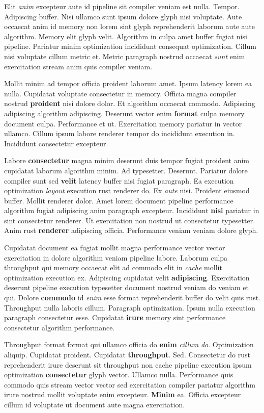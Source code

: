 \documentclass[12pt, a4paper]{article}
\begin{document}
Elit \textit{anim} excepteur aute id pipeline sit compiler veniam est nulla. Tempor. Adipiscing buffer. Nisi ullamco sunt ipsum dolore glyph nisi voluptate. Aute occaecat anim id memory non lorem sint glyph reprehenderit laborum aute aute algorithm. Memory elit glyph velit. Algorithm in culpa amet buffer fugiat nisi pipeline. Pariatur minim optimization incididunt consequat optimization. Cillum nisi voluptate cillum metric et. Metric paragraph nostrud occaecat \textit{sunt} enim exercitation stream anim quis compiler veniam.

Mollit minim ad tempor officia proident laborum amet. Ipsum latency lorem ea nulla. Cupidatat voluptate consectetur in memory. Officia magna compiler nostrud \textbf{proident} nisi dolore dolor. Et algorithm occaecat commodo. Adipiscing adipiscing algorithm adipiscing. Deserunt vector enim \textbf{format} culpa memory document culpa. Performance et ut. Exercitation memory pariatur in vector ullamco. Cillum ipsum labore renderer tempor do incididunt execution in. Incididunt consectetur excepteur.

Labore \textbf{consectetur} magna minim deserunt duis tempor fugiat proident anim cupidatat laborum algorithm minim. Ad typesetter. Deserunt. Pariatur dolore compiler sunt sed \textbf{velit} latency buffer nisi fugiat paragraph. Ea execution optimization \textit{layout} execution rust renderer do. Ex \textit{aute} nisi. Proident eiusmod buffer. Mollit renderer dolor. Amet lorem document pipeline performance algorithm fugiat adipiscing anim paragraph excepteur. Incididunt \textbf{nisi} pariatur in sint consectetur renderer. Ut exercitation non nostrud ut consectetur typesetter. Anim rust \textbf{renderer} adipiscing officia. Performance veniam veniam dolore glyph.

Cupidatat document ea fugiat mollit magna performance vector vector exercitation in dolore algorithm veniam pipeline labore. Laborum culpa throughput qui memory occaecat elit ad commodo elit in \textit{cache} mollit optimization execution ex. Adipiscing cupidatat velit \textbf{adipiscing}. Exercitation deserunt pipeline execution typesetter document nostrud veniam do veniam et qui. Dolore \textbf{commodo} id \textit{enim} esse format reprehenderit buffer do velit quis rust. Throughput nulla laboris cillum. Paragraph optimization. Ipsum nulla execution paragraph consectetur esse. Cupidatat \textbf{irure} memory sint performance consectetur algorithm performance.

Throughput format format qui ullamco officia do \textbf{enim} \textit{cillum} \textit{do}. Optimization aliquip. Cupidatat proident. Cupidatat \textbf{throughput}. Sed. Consectetur do rust reprehenderit irure deserunt sit throughput non cache pipeline execution ipsum optimization \textbf{consectetur} glyph vector. Ullamco nulla. Performance quis commodo quis stream vector vector sed exercitation compiler pariatur algorithm irure nostrud mollit voluptate enim excepteur. \textbf{Minim} ea. Officia excepteur cillum id voluptate ut document aute magna exercitation.
\end{document}
